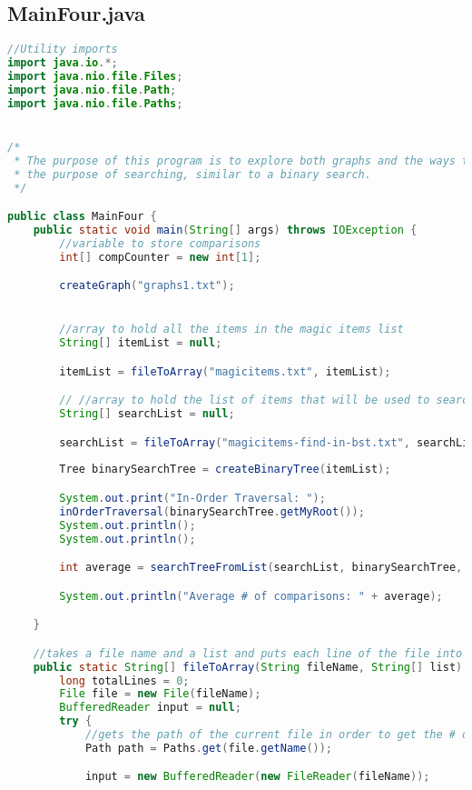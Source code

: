 \documentclass[letterpaper, 10pt,DIV=13]{scrartcl}
\numberwithin{equation}{section} %
\numberwithin{figure}{section} %
\numberwithin{table}{section} %
\begin{document}
\subsection{MainFour.java}
\begin{lstlisting}[frame=single, language=java, breaklines]  
//Utility imports
import java.io.*;
import java.nio.file.Files;
import java.nio.file.Path;
import java.nio.file.Paths;


/* 
 * The purpose of this program is to explore both graphs and the ways to traverse them, as well as create a binary tree to be used for
 * the purpose of searching, similar to a binary search.
 */

public class MainFour {
    public static void main(String[] args) throws IOException {
        //variable to store comparisons 
        int[] compCounter = new int[1];

        createGraph("graphs1.txt");


        //array to hold all the items in the magic items list
        String[] itemList = null;

        itemList = fileToArray("magicitems.txt", itemList);

        // //array to hold the list of items that will be used to search the binary tree
        String[] searchList = null;

        searchList = fileToArray("magicitems-find-in-bst.txt", searchList);
        
        Tree binarySearchTree = createBinaryTree(itemList);

        System.out.print("In-Order Traversal: ");
        inOrderTraversal(binarySearchTree.getMyRoot());
        System.out.println();
        System.out.println();

        int average = searchTreeFromList(searchList, binarySearchTree, compCounter);

        System.out.println("Average # of comparisons: " + average);

    }

    //takes a file name and a list and puts each line of the file into a String in an array
    public static String[] fileToArray(String fileName, String[] list) throws IOException {
        long totalLines = 0;
        File file = new File(fileName);
        BufferedReader input = null;
        try {
            //gets the path of the current file in order to get the # of lines
            Path path = Paths.get(file.getName());

            input = new BufferedReader(new FileReader(fileName)); 


\end{lstlisting}
\end{document}
